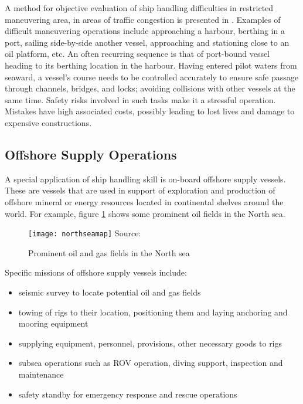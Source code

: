 A method for objective evaluation of ship handling difficulties in restricted maneuvering area, in areas of traffic congestion is presented in \parencite{inoue2000evaluation}. Examples of difficult maneuvering operations include approaching a harbour, berthing in a port, sailing side-by-side another vessel, approaching and stationing close to an oil platform, etc. An often recurring sequence is that of  port-bound vessel heading to its berthing location in the harbour. Having entered pilot waters from seaward, a vessel's course needs to be controlled accurately to ensure safe passage through channels, bridges, and locks; avoiding collisions with other vessels at the same time. Safety risks involved in such tasks make it a stressful operation. Mistakes have high associated costs, possibly leading to lost lives and damage to expensive constructions.

\subsection{Offshore Supply Operations}

A special application of ship handling skill is on-board offshore supply vessels. These are vessels that are used in support of exploration and production of offshore mineral or energy resources located in continental shelves around the world. For example, figure \ref{fig:northseamap} shows some prominent oil fields in the North sea. 
\begin{figure}
	\centering
	\caption{Prominent oil and gas fields in the North sea}
	\texttt{[image: northseamap]}
	\label{fig:northseamap}
	\hbox{\small Source: }
\end{figure}
Specific missions of offshore supply vessels include: 
\begin{itemize}
\item seismic survey to locate potential oil and gas fields
\item towing of rigs to their location, positioning them and laying anchoring and mooring equipment
\item supplying equipment, personnel, provisions, other necessary goods to rigs
\item subsea operations such as ROV operation, diving support, inspection and maintenance
\item safety standby for emergency response and rescue operations
\end{itemize}

